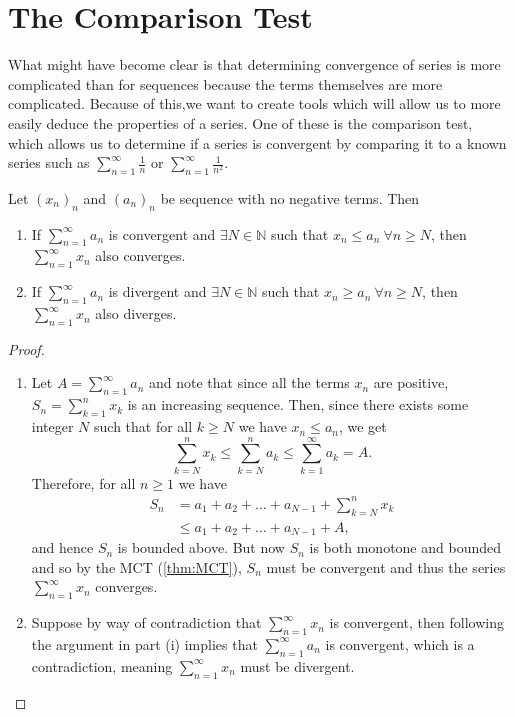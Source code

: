 \documentclass[../real_analysis.tex]{subfiles}
\begin{document}
    \section{The Comparison Test}\label{sec:comparison-test}
        What might have become clear is that determining convergence of series is more complicated than for sequences because the terms themselves are more complicated. Because of this,we want to create tools which will allow us to more easily deduce the properties of a series. One of these is the comparison test, which allows us to determine if a series is convergent by comparing it to a known series such as $\sum_{n=1}^\infty\frac{1}{n}$ or $\sum_{n=1}^\infty\frac{1}{n^2}$.
        \begin{theorem}\label{thm:comparison-test}
            Let $(x_n)_n$ and $(a_n)_n$ be sequence with no negative terms. Then
            \begin{enumerate}[label={\upshape(\roman*)}]
                \item If $\sum_{n=1}^\infty a_n$ is convergent and $\exists N\in\mathbb{N}$ such that $x_n\leq a_n\ \forall n\geq N$, then $\sum_{n=1}^\infty x_n$ also converges.
                \item If $\sum_{n=1}^\infty a_n$ is divergent and $\exists N\in\mathbb{N}$ such that $x_n\geq a_n\ \forall n\geq N$, then $\sum_{n=1}^\infty x_n$ also diverges.
            \end{enumerate}
        \end{theorem}
        \begin{proof}
            \begin{enumerate}[label={\upshape(\roman*)}]
                \item Let $A=\sum_{n=1}^\infty a_n$ and note that since all the terms $x_n$ are positive, $S_n=\sum_{k=1}^n x_k$ is an increasing sequence. Then, since there exists some integer $N$ such that for all $k\geq N$ we have $x_n\leq a_n$, we get
                \begin{equation}
                    \sum_{k=N}^n x_k\leq\sum_{k=N}^n a_k\leq\sum_{k=1}^\infty a_k=A.
                \end{equation}
                Therefore, for all $n\geq1$ we have
                \begin{align}
                    S_n&=a_1+a_2+\dots+a_{N-1}+\sum_{k=N}^n x_k\\
                    &\leq a_1+a_2+\dots+a_{N-1}+A,
                \end{align}
                and hence $S_n$ is bounded above. But now $S_n$ is both monotone and bounded and so by the MCT (\ref{thm:MCT}), $S_n$ must be convergent and thus the series $\sum_{n=1}^\infty x_n$ converges.
                \item Suppose by way of contradiction that $\sum_{n=1}^\infty x_n$ is convergent, then following the argument in part (i) implies that $\sum_{n=1}^\infty a_n$ is convergent, which is a contradiction, meaning $\sum_{n=1}^\infty x_n$ must be divergent.
            \end{enumerate}
        \end{proof}
\end{document}
